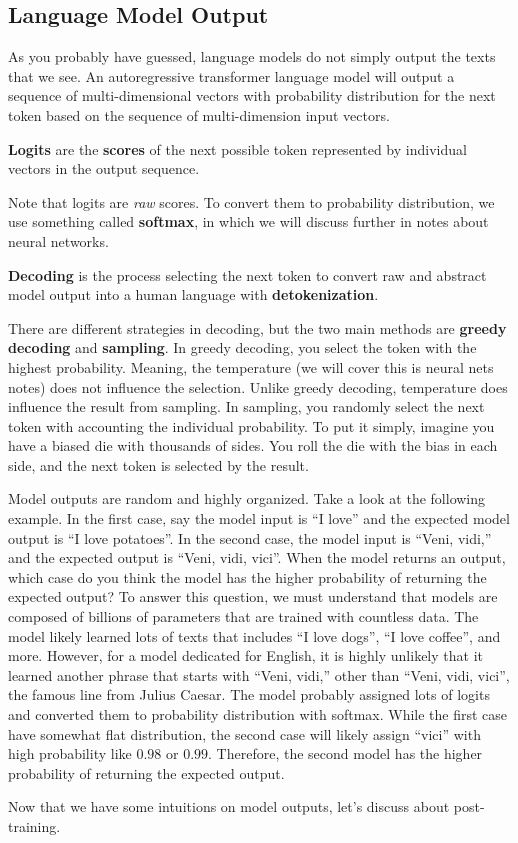 \documentclass[../../../main.tex]{subfiles}
\begin{document}
\subsection{Language Model Output}

As you probably have guessed, language models do not simply
output the texts that we see. An autoregressive transformer
language model will output a sequence of multi-dimensional
vectors with probability distribution for the next token based
on the sequence of multi-dimension input vectors.

\begin{definition}{}{}
\textbf{Logits} are the \textbf{scores} of the next possible
token represented by individual vectors in the output sequence.
\end{definition}

Note that logits are \textit{raw} scores. To convert them to
probability distribution, we use something called
\textbf{softmax}, in which we will discuss further in notes
about neural networks.

\begin{definition}{}{}
\textbf{Decoding} is the process selecting the next token to
convert raw and abstract model output into a human language
with \textbf{detokenization}.
\end{definition}

There are different strategies in decoding, but the two main
methods are \textbf{greedy decoding} and \textbf{sampling}.
In greedy decoding, you select the token with the highest
probability. Meaning, the temperature (we will cover this
is neural nets notes) does not influence the selection.
Unlike greedy decoding, temperature does influence the result
from sampling. In sampling, you randomly select the next token
with accounting the individual probability. To put it simply,
imagine you have a biased die with thousands of sides. You
roll the die with the bias in each side, and the next token
is selected by the result.

Model outputs are random and highly organized. Take a look
at the following example. In the first case, say the model
input is ``I love'' and the expected model output is ``I
love potatoes''. In the second case, the model input is
``Veni, vidi,'' and the expected output is ``Veni, vidi,
vici''. When the model returns an output, which case do you
think the model has the higher probability of returning the
expected output? To answer this question, we must understand
that models are composed of billions of parameters that are
trained with countless data. The model likely learned lots
of texts that includes ``I love dogs'', ``I love coffee'',
and more. However, for a model dedicated for English,
it is highly unlikely that it learned another phrase that
starts with ``Veni, vidi,'' other than ``Veni, vidi, vici'',
the famous line from Julius Caesar. The model probably
assigned lots of logits and converted them to probability
distribution with softmax. While the first case have somewhat
flat distribution, the second case will likely assign ``vici''
with high probability like $0.98$ or $0.99$. Therefore, the
second model has the higher probability of returning the
expected output. 

Now that we have some intuitions on model outputs, let's
discuss about post-training.
\end{document}
